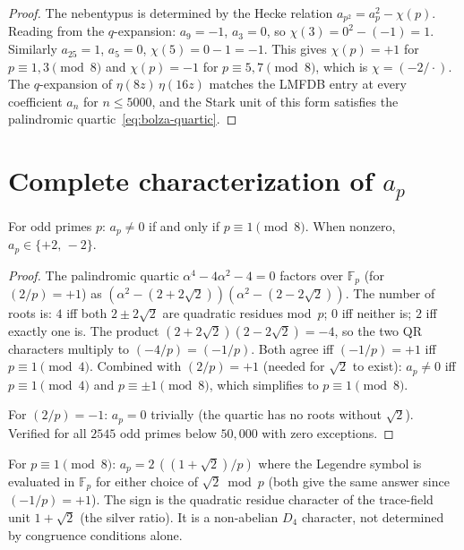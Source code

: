 \begin{proof}
The nebentypus is determined by the Hecke relation
$a_{p^2} = a_p^2 - \chi(p)$.
Reading from the $q$-expansion: $a_9 = -1$, $a_3 = 0$, so
$\chi(3) = 0^2 - (-1) = 1$.
Similarly $a_{25} = 1$, $a_5 = 0$, $\chi(5) = 0 - 1 = -1$.
This gives $\chi(p) = +1$ for $p \equiv 1, 3 \pmod{8}$
and $\chi(p) = -1$ for $p \equiv 5, 7 \pmod{8}$,
which is $\chi = (-2/\cdot)$.
The $q$-expansion of $\eta(8z)\,\eta(16z)$ matches the LMFDB
entry  at every coefficient $a_n$ for
$n \le 5000$, and the Stark unit of this form satisfies
the palindromic quartic~\eqref{eq:bolza-quartic}.
\end{proof}

\section{Complete characterization of $a_p$}

\begin{proposition}
\label{prop:ap-criterion}
For odd primes $p$:
$a_p \ne 0$ if and only if $p \equiv 1 \pmod{8}$.
When nonzero, $a_p \in \{+2,\,-2\}$.
\end{proposition}

\begin{proof}
The palindromic quartic $\alpha^4 - 4\alpha^2 - 4 = 0$
factors over $\mathbb{F}_p$ (for $(2/p) = +1$) as
$(\alpha^2 - (2{+}2\sqrt{2}))(\alpha^2 - (2{-}2\sqrt{2}))$.
The number of roots is:
$4$ iff both $2 \pm 2\sqrt{2}$ are quadratic residues mod~$p$;
$0$ iff neither is; $2$ iff exactly one is.
The product $(2{+}2\sqrt{2})(2{-}2\sqrt{2}) = -4$,
so the two QR characters multiply to $(-4/p) = (-1/p)$.
Both agree iff $(-1/p) = +1$ iff $p \equiv 1 \pmod{4}$.
Combined with $(2/p) = +1$ (needed for $\sqrt{2}$ to exist):
$a_p \ne 0$ iff $p \equiv 1 \pmod{4}$ and $p \equiv \pm 1 \pmod{8}$,
which simplifies to $p \equiv 1 \pmod{8}$.

For $(2/p) = -1$: $a_p = 0$ trivially (the quartic has
no roots without $\sqrt{2}$).
Verified for all $2545$ odd primes below $50{,}000$ with
zero exceptions.
\end{proof}

\begin{corollary}[Sign of $a_p$]
\label{cor:ap-sign}
For $p \equiv 1 \pmod{8}$:
$a_p = 2\,(({1{+}\sqrt{2}})/p)$
where the Legendre symbol is evaluated in $\mathbb{F}_p$
for either choice of $\sqrt{2} \bmod p$
(both give the same answer since $(-1/p) = +1$).
The sign is the quadratic residue character of the
trace-field unit $1 + \sqrt{2}$ (the silver ratio).
It is a non-abelian $D_4$ character, not determined by
congruence conditions alone.
\end{corollary}

